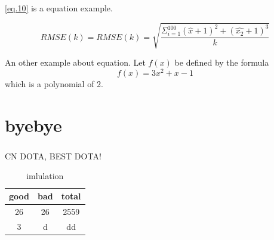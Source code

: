 \documentclass[a4paper]{article}
\newcommand{\upcite}[1]{\textsuperscript{\cite{#1}}}
\newcommand{\topcaption}{%
	\setlength{\abovecaptionskip}{0pt}%
	\setlength{\belowcaptionskip}{10pt}%
	\caption}   %
\begin{document}
	\autoref{eq.10} is a equation example.
	
	
	\begin{equation}
		RMSE(k)=RMSE(k)=\sqrt{\frac{\Sigma^{100}_{i=1}(\hat{x}+1)^2+(\hat{x_2}+1)^3}{k}}
	\end{equation}\label{eq.10}
	
	An other example about equation.
	Let $f(x)$ be defined by the formula$$f(x)=3x^2+x-1$$ which is a polynomial of 2.
	
	
	\section{byebye}
	
	CN DOTA, BEST DOTA!\upcite{Menard2002Applied,Peduzzi1996A,Compton2002HABITAT}
	
	\begin{table}[http]
		\renewcommand{\arraystretch}{2}
		\centering
		\topcaption{imlulation}
		\label{tab}
		\begin{tabular}{ccc}
			\hline \hline
			good & bad & total  \\ \hline
			26   & 26  & 2559   \\
			3    & d   & dd     \\ \hline \hline
		\end{tabular}
	\end{table}
	
	
	
	
	
\end{document}
